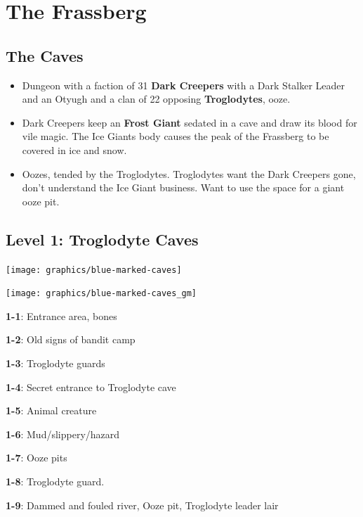\documentclass[
]{book}
\begin{document}
\chapter{The Frassberg}\label{frassberg}

\section{The Caves}\label{the-caves}

\begin{itemize}
\item
  Dungeon with a faction of 31 \textbf{Dark Creepers} with a Dark Stalker Leader and an Otyugh and a clan of 22 opposing \textbf{Troglodytes}, ooze.
\item
  Dark Creepers keep an \textbf{Frost Giant} sedated in a cave and draw its blood for vile magic. The Ice Giants body causes the peak of the Frassberg to be covered in ice and snow.
\item
  Oozes, tended by the Troglodytes. Troglodytes want the Dark Creepers gone, don't understand the Ice Giant business. Want to use the space for a giant ooze pit.
\end{itemize}

\section{Level 1: Troglodyte Caves}\label{level-1-troglodyte-caves}

\begin{center}\texttt{[image: graphics/blue-marked-caves]} \end{center}

\begin{center}\texttt{[image: graphics/blue-marked-caves\_gm]} \end{center}

\textbf{1-1}: Entrance area, bones

\textbf{1-2}: Old signs of bandit camp

\textbf{1-3}: Troglodyte guards

\textbf{1-4}: Secret entrance to Troglodyte cave

\textbf{1-5}: Animal creature

\textbf{1-6}: Mud/slippery/hazard

\textbf{1-7}: Ooze pits

\textbf{1-8}: Troglodyte guard.

\textbf{1-9}: Dammed and fouled river, Ooze pit, Troglodyte leader lair
\end{document}
